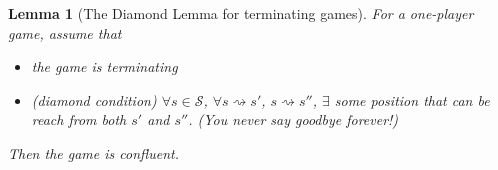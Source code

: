 \documentclass{report}
\newtheorem{lemma}{Lemma}[section]
\theoremstyle{definition}
\theoremstyle{remark}
\numberwithin{equation}{section}
\begin{document}
\begin{lemma}[The Diamond Lemma for terminating games]
    For a one-player game, assume that
    \begin{itemize}
        \item the game is terminating 
        \item[$\diamond$](diamond condition) $\forall s \in \mathcal{S}$, $\forall s \rightsquigarrow s'$, $s \rightsquigarrow s''$, $\exists$ some position that can be reach from both $s'$ and $s''$. (You never say goodbye forever!)
    \end{itemize}
    Then the game is confluent.
\end{lemma}
\end{document}
